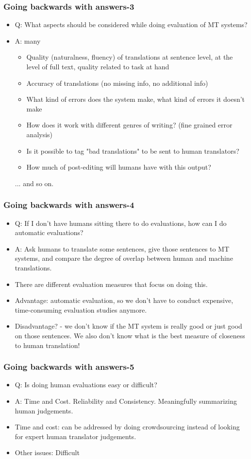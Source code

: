 \documentclass{beamer}
\begin{document}
\begin{frame}
\frametitle{Going backwards with answers-3}
\begin{itemize}
\item Q: What aspects should be considered while doing evaluation of MT systems?
\item A: many
\begin{itemize}
\item Quality (naturalness, fluency) of translations at sentence level, at the level of full text, quality related to task at hand
\item Accuracy of translations (no missing info, no additional info)
\item What kind of errors does the system make, what kind of errors it doesn't make
\item How does it work with different genres of writing? (fine grained error analysis)
\item Is it possible to tag "bad translations" to be sent to human translators?
\item How much of post-editing will humans have with this output? 
\end{itemize}
... and so on.
\end{itemize}
\end{frame}

\begin{frame}
\frametitle{Going backwards with answers-4}
\begin{itemize}
\item Q: If I don't have humans sitting there to do evaluations, how can I do automatic evaluations?
\item A: Ask humans to translate some sentences, give those sentences to MT systems, and compare the degree of overlap between human and machine translations.
\item There are different evaluation measures that focus on doing this. 
\item Advantage: automatic evaluation, so we don't have to conduct expensive, time-consuming evaluation studies anymore.
\item Disadvantage? \pause - we don't know if the MT system is really good or just good on those sentences. We also don't know what is the best measure of closeness to human translation!
\end{itemize}
\end{frame}

\begin{frame}
\frametitle{Going backwards with answers-5}
\begin{itemize}
\item Q: Is doing human evaluations easy or difficult?
\item A: Time and Cost. Reliability and Consistency. Meaningfully summarizing human judgements. 
\item Time and cost: can be addressed by doing crowdsourcing instead of looking for expert human translator judgements. 
\item Other issues: Difficult
\end{itemize}
\end{frame}
\end{document}

